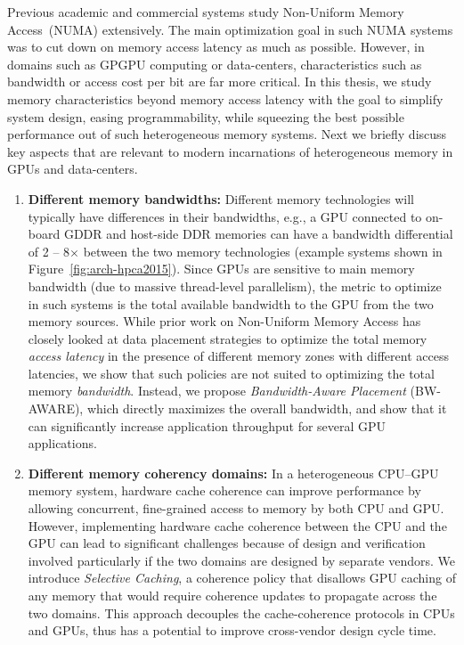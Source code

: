 Previous academic and commercial systems study Non-Uniform Memory Access~(NUMA)
extensively. The main optimization goal in such NUMA systems was to cut
down on memory access latency as much as possible. However, in domains such as
GPGPU computing or data-centers, characteristics
such as bandwidth or access cost per bit are far more critical. In this thesis, we study memory characteristics
beyond memory access latency with the goal to simplify system design, easing
programmability, while squeezing the best possible performance out
of such heterogeneous memory systems.  Next we briefly discuss key aspects that
are relevant to modern incarnations of heterogeneous memory in GPUs and
data-centers.

\begin{enumerate}
\item
\textbf{Different memory bandwidths:}
Different memory technologies will typically have differences in their
bandwidths, e.g., a GPU connected to on-board GDDR and host-side DDR memories
can have a bandwidth differential of 2 -- 8$\times$ between the two
memory technologies (example systems shown in Figure~\ref{fig:arch-hpca2015}).
Since GPUs are sensitive to main memory bandwidth (due to massive thread-level
parallelism), the metric to optimize in such systems is the total available
bandwidth to the GPU from the two memory sources. While prior work on
Non-Uniform Memory Access has closely looked at data placement strategies
to optimize the total memory {\it access latency} in the presence of different
memory zones with different access latencies, we show that such policies are not
suited to optimizing the total memory {\it bandwidth}. Instead, we propose {\it
Bandwidth-Aware Placement} (BW-AWARE), which directly maximizes the overall
bandwidth, and show that it can significantly increase application throughput
for several GPU applications.

\item
\textbf{Different memory coherency domains:} 
In a heterogeneous CPU--GPU memory system, hardware cache coherence can improve
performance by allowing concurrent, fine-grained access to memory by both CPU
and GPU.  However, implementing hardware cache coherence between the CPU and the
GPU can lead to significant challenges because of design and verification
involved particularly if the two domains are designed by separate vendors. We
introduce {\it Selective Caching}, a coherence policy that disallows GPU caching
of any memory that would require coherence updates to propagate across the two
domains. This approach decouples the cache-coherence protocols in CPUs and GPUs,
thus has a potential to improve cross-vendor design cycle time.


\end{enumerate}
